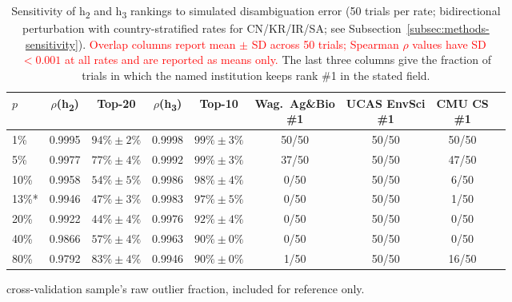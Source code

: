 \begin{table}[h]
	\centering
	\caption{Sensitivity of h\textsubscript{2} and h\textsubscript{3} rankings to simulated disambiguation error (50 trials per rate; bidirectional perturbation with country-stratified rates for CN/KR/IR/SA; see Subsection~\ref{subsec:methods-sensitivity}). \textcolor{red}{Overlap columns report mean $\pm$ SD across 50 trials; Spearman $\rho$ values have SD $< 0.001$ at all rates and are reported as means only.} The last three columns give the fraction of trials in which the named institution keeps rank \#1 in the stated field.}
	\label{tab:sensitivity}
	\footnotesize
	\begin{tabular}{@{}lcccccccc@{}}
	\toprule
	$p$ & $\rho$(h\textsubscript{2}) & Top-20 & $\rho$(h\textsubscript{3}) & Top-10 & \makecell{Wag.\ Ag\&Bio\\\#1} & \makecell{UCAS EnvSci\\\#1} & \makecell{CMU CS\\\#1} \\
	\midrule
	1\%   & 0.9995 & $94\%\pm2\%$ & 0.9998 & $99\%\pm3\%$ & 50/50 & 50/50 & 50/50 \\
	5\%   & 0.9977 & $77\%\pm4\%$ & 0.9992 & $99\%\pm3\%$ & 37/50 & 50/50 & 47/50 \\
	10\%  & 0.9958 & $54\%\pm5\%$ & 0.9986 & $98\%\pm4\%$ & 0/50  & 50/50 & 6/50  \\
	13\%* & 0.9946 & $47\%\pm3\%$ & 0.9983 & $97\%\pm5\%$ & 0/50  & 50/50 & 1/50  \\
	20\%  & 0.9922 & $44\%\pm4\%$ & 0.9976 & $92\%\pm4\%$ & 0/50  & 50/50 & 0/50  \\
	40\%  & 0.9866 & $57\%\pm4\%$ & 0.9963 & $90\%\pm0\%$ & 0/50  & 50/50 & 0/50  \\
	80\%  & 0.9792 & $83\%\pm4\%$ & 0.9946 & $90\%\pm0\%$ & 1/50  & 50/50 & 16/50 \\
	\bottomrule
	\end{tabular}
	\vspace{2pt}\raggedright *cross-validation sample's raw outlier fraction, included for reference only.
\end{table}